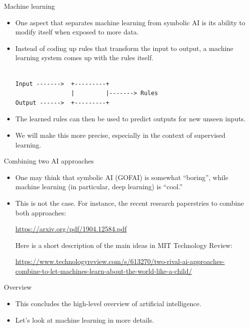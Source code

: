 \documentclass{beamer}
\begin{document}
\begin{frame}[fragile]{Machine learning}
\begin{itemize}
\item One aspect that separates machine learning from symbolic AI is its ability to modify itself when exposed to more data.

\item Instead of coding up rules that transform the input to output, a machine learning system comes up with the rules itself.

\begin{verbatim}

Input ------->  +---------+
                |         |-------> Rules
Output ------>  +---------+

\end{verbatim}
\item The learned rules can then be used to predict outputs for new unseen inputs.

\item We will make this more precise, especially in the context of supervised learning.
\end{itemize}
\end{frame}

\begin{frame}{Combining two AI approaches}
\begin{itemize}
\item One may think that symbolic AI (GOFAI) is somewhat ``boring'', while machine learning (in particular, deep learning) is ``cool.''

\item This is not the case. For instance, the recent research paperstries to combine both approaches:

\medskip
\url{https://arxiv.org/pdf/1904.12584.pdf}

\medskip
Here is a short description of the main ideas in MIT  Technology Review:

{\tiny \url{https://www.technologyreview.com/s/613270/two-rival-ai-approaches-combine-to-let-machines-learn-about-the-world-like-a-child/}}
\end{itemize}
\end{frame}

\begin{frame}{Overview}
\begin{itemize}
\item This concludes the high-level overview of artificial intelligence.

\item Let's look at machine learning in more details.
\end{itemize}
\end{frame}
\end{document}
